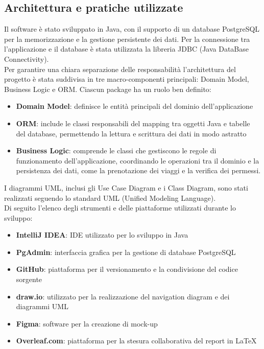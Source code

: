 \subsection{Architettura e pratiche utilizzate}
Il software è stato sviluppato in Java, con il supporto di un database PostgreSQL per la memorizzazione e la gestione persistente dei dati. Per la connessione tra l’applicazione e il database è stata utilizzata la libreria JDBC (Java DataBase Connectivity).\\
\noindent
Per garantire una chiara separazione delle responsabilità l'architettura del progetto è stata suddivisa in tre macro-componenti principali: Domain Model, Business Logic e ORM. Ciascun package ha un ruolo ben definito:
\begin{itemize}
\item \textbf{Domain Model}: definisce le entità principali del dominio dell'applicazione
\item \textbf{ORM}: include le classi responsabili del mapping tra oggetti Java e tabelle del database, permettendo la lettura e scrittura dei dati in modo astratto
\item \textbf{Business Logic}: comprende le classi che gestiscono le regole di funzionamento dell'applicazione, coordinando le operazioni tra il dominio e la persistenza dei dati, come la prenotazione dei viaggi e la verifica dei permessi.
\end{itemize}
I diagrammi UML, inclusi gli Use Case Diagram e i Class Diagram, sono stati realizzati seguendo lo standard UML (Unified Modeling Language).\\
\noindent Di seguito l’elenco degli strumenti e delle piattaforme utilizzati durante lo sviluppo:
\begin{itemize}
\item \textbf{IntelliJ IDEA}: IDE utilizzato per lo sviluppo in Java
\item \textbf{PgAdmin}: interfaccia grafica per la gestione di database PostgreSQL
\item \textbf{GitHub}: piattaforma per il versionamento e la condivisione del codice sorgente
\item \textbf{draw.io}: utilizzato per la realizzazione del navigation diagram e dei diagrammi UML
\item \textbf{Figma}: software per la creazione di mock-up
\item \textbf{Overleaf.com}: piattaforma per la stesura collaborativa del report in \LaTeX
\end{itemize}
\newpage
